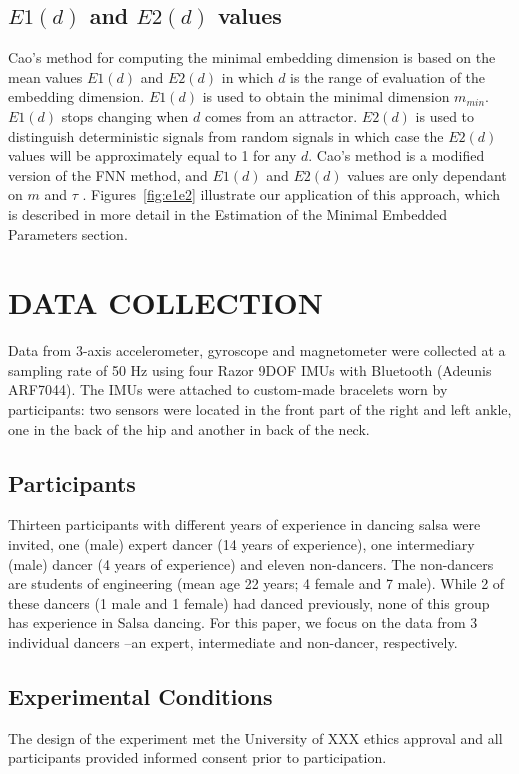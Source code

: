 \documentclass{sigchi}
\begin{document}
\subsection{$E1(d)$ and $E2(d)$ values}
Cao's method for computing the minimal embedding dimension is based on the mean values $E1(d)$ and $E2(d)$ 
in which $d$ is the range of evaluation of the embedding dimension.
$E1(d)$ is used to obtain the minimal dimension $m_{min}$. $E1(d)$ stops changing when $d$ comes from an attractor.
$E2(d)$ is used to distinguish deterministic signals from random signals in which case the $E2(d)$ values will be approximately equal to 1 for any $d$.
Cao's method is a modified version of the FNN method, and $E1(d)$ and $E2(d)$ values are only dependant on $m$ and $\tau$ \cite{Cao1997}.
Figures~\ref{fig:e1e2} illustrate our application of this approach,
which is described in more detail in the Estimation of the Minimal Embedded Parameters section.

\section{DATA COLLECTION}
Data from 3-axis accelerometer, gyroscope and magnetometer were collected at a sampling rate of 50 Hz 
using four Razor 9DOF IMUs with Bluetooth (Adeunis ARF7044). 
The IMUs were attached to custom-made bracelets worn by participants: 
two sensors were located in the front part of the right and left ankle, one in the 
back of the hip and another in back of the neck. 


\subsection{Participants}
Thirteen participants with different years of experience in dancing salsa were invited, one (male) 
expert dancer (14 years of experience), one intermediary (male) dancer (4 years of experience) 
and eleven non-dancers. 
The non-dancers are students of engineering (mean age 22 years; 4 female and 7 male).  
While 2 of these dancers (1 male and 1 female) had danced previously, none of this group has experience 
in Salsa dancing.  
For this paper, we focus on the data from 3 individual dancers --an expert, intermediate and non-dancer, respectively.



\subsection{Experimental Conditions}
The design of the experiment met the University of XXX ethics approval and all participants provided informed 
consent prior to participation.
\end{document}
